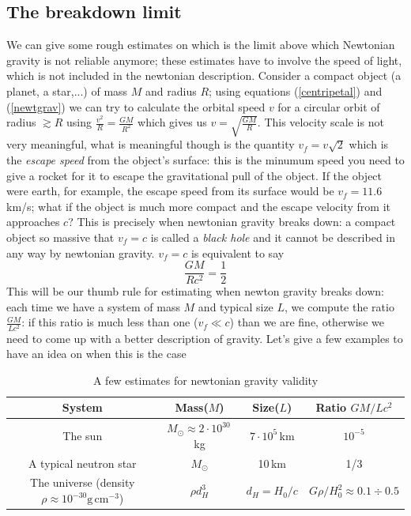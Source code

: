 \subsection{The breakdown limit}
We can give some rough estimates on which is the limit above which Newtonian gravity is not reliable anymore; these estimates have to involve the speed of light, which is not included in the newtonian description. Consider a compact object (a planet, a star,...) of mass $M$ and radius $R$; using equations (\ref{centripetal}) and (\ref{newtgrav}) we can try to calculate the orbital speed $v$ for a circular orbit of radius $\gtrsim R$ using $\frac{v^2}{R}=\frac{GM}{R^2}$ which gives us $v=\sqrt{\frac{GM}{R}}$. This velocity scale is not very meaningful, what is meaningful though is the quantity $v_f=v\sqrt{2}$ which is the \textit{escape speed} from the object's surface: this is the minumum speed you need to give a rocket for it to escape the gravitational pull of the object. If the object were earth, for example, the escape speed from its surface would be $v_f=11.6$\,km/s; what if the object is much more compact and the escape velocity from it approaches $c$? This is precisely when newtonian gravity breaks 
down: a compact object so massive that $v_f=c$ is called a \textit{black hole} and it cannot be described in any way by newtonian gravity. $v_f=c$ is equivalent to say
\begin{equation}
\label{stronggrav}
\frac{GM}{Rc^2}=\frac{1}{2}
\end{equation} 
This will be our thumb rule for estimating when newton gravity breaks down: each time we have a system of mass $M$ and typical size $L$, we compute the ratio $\frac{GM}{Lc^2}$: if this ratio is much less than one ($v_f\ll c$) than we are fine, otherwise we need to come up with a better description of gravity. Let's give a few examples to have an idea on when this is the case
\begin{table}[htbp]
\begin{center}
\begin{tabular}{|c|c|c|c|} \hline
\textbf{System} & \textbf{Mass}($M$) & \textbf{Size}($L$) & \textbf{Ratio} $GM/Lc^2$ \\ \hline
The sun & $M_\odot\approx 2\cdot 10^{30}$\,kg & $7\cdot10^5$\,km &$10^{-5}$ \\ \hline
A typical neutron star & $M_\odot$ & 10\,km &1/3 \\ \hline
The universe (density $\rho \approx 10^{-30}\mathrm{g}\,\mathrm{cm}^{-3}$)& $\rho d_H^3$ & $d_H=H_0/c$ &$G\rho/H_0^2\approx 0.1\div0.5$ \\ \hline

\end{tabular}
\end{center}
\caption{A few estimates for newtonian gravity validity}
\end{table}
